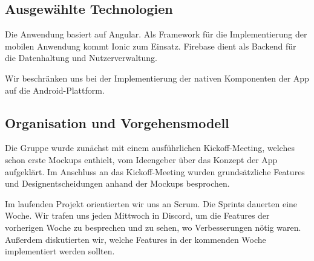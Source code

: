 \subsection{Ausgewählte Technologien}

Die Anwendung basiert auf Angular.
Als Framework für die Implementierung der mobilen Anwendung kommt Ionic zum Einsatz.
Firebase dient als Backend für die Datenhaltung und Nutzerverwaltung.

Wir beschränken uns bei der Implementierung der nativen Komponenten der App auf die Android-Plattform.

\pagebreak

\subsection{Organisation und Vorgehensmodell}

Die Gruppe wurde zunächst mit einem ausführlichen Kickoff-Meeting, welches schon erste Mockups enthielt, vom Ideengeber über das Konzept der App aufgeklärt.
Im Anschluss an das Kickoff-Meeting wurden grundsätzliche Features und Designentscheidungen anhand der Mockups besprochen.

Im laufenden Projekt orientierten wir uns an Scrum.
Die Sprints dauerten eine Woche.
Wir trafen uns jeden Mittwoch in Discord, um die Features der vorherigen Woche zu besprechen und zu sehen, wo Verbesserungen nötig waren.
Außerdem diskutierten wir, welche Features in der kommenden Woche implementiert werden sollten.
